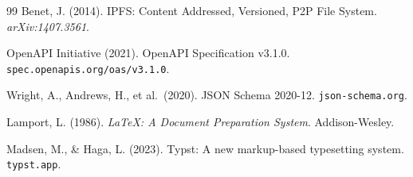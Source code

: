 \documentclass[11pt]{rrvix}
\begin{document}
\begin{thebibliography}{99}
Benet, J. (2014). IPFS: Content Addressed, Versioned, P2P File System. \emph{arXiv:1407.3561}.

OpenAPI Initiative (2021). OpenAPI Specification v3.1.0. \texttt{spec.openapis.org/oas/v3.1.0}.

Wright, A., Andrews, H., et al.\ (2020). JSON Schema 2020-12. \texttt{json-schema.org}.

Lamport, L. (1986). \emph{LaTeX: A Document Preparation System}. Addison-Wesley.

Madsen, M., \& Haga, L. (2023). Typst: A new markup-based typesetting system. \texttt{typst.app}.

\end{thebibliography}
\end{document}
